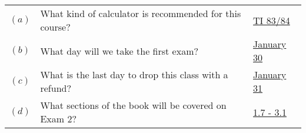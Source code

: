 \documentclass {article}
\newenvironment{prob}[2][]{\begin{trivlist}
\item[\hskip \labelsep {\bfseries #1}\hskip \labelsep {\bfseries #2.}]}{\end{trivlist}}
\begin{document}
\vspace {1cm}

\begin {prob}{5} \ \\ \\ \relax
    \begin {tabular}{cll}
        $(a)$ & What kind of calculator is recommended for this course? & \underline{TI 83/84} \\ [2ex]
        $(b)$ & What day will we take the first exam?                   & \underline{January 30} \\ [2ex]
        $(c)$ & What is the last day to drop this class with a refund?  & \underline{January 31} \\ [2ex]
        $(d)$ & What sections of the book will be covered on Exam 2?    & \underline{1.7 - 3.1}
    \end {tabular}
\end {prob}
\end{document}
